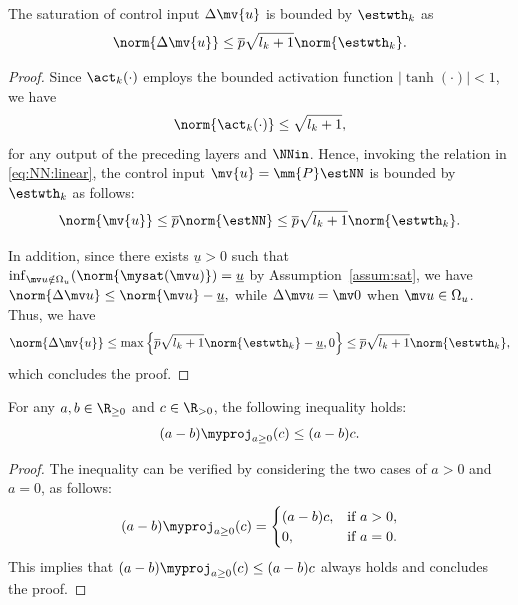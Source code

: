 \documentclass[letterpaper, journal]{IEEEtran}
\begin{document}
\begin{lem} \label{lem:delta:u:bound}
  The saturation of control input $\Delta\mv{u}$ is bounded by $\estwth_k$ as 
  \begin{equation*}
    \norm{\Delta\mv{u}}
    \le 
    \overline{p}
    \sqrt{l_k+1}
    \norm{\estwth_k}
    .
  \end{equation*}
\end{lem}

\begin{proof}
  Since $\act_k(\cdot)$ employs the bounded activation function $\vert\tanh(\cdot)\vert < 1$, we have 
  \begin{equation}
    \norm{\act_k(\cdot)} \le \sqrt{l_k+1}
    ,
  \end{equation}
  for any output of the preceding layers and $\NNin$.
  Hence, invoking the relation in \eqref{eq:NN:linear}, the control input $\mv{u}=\mm{P}\estNN$ is bounded by $\estwth_k$ as follows:
  \begin{equation} \label{eq:NN:bound}
    \norm{\mv{u}} 
    \le
    \overline{p}
    \norm{\estNN}
    \le
    \overline{p}
    \sqrt{l_k+1}\norm{\estwth_k}
    .   
  \end{equation}

  In addition, since there exists $\underline{u}>0$ such that $\inf_{\mv u\notin\Omega_u}\allowbreak(\norm{\mysat(\mv u)})=\underline{u}$ by Assumption~\ref{assum:sat}, we have
  $
    \norm{\Delta\mv u}
    \le
    \norm{\mv u}-\underline{u}
    ,
  $ 
  while $\Delta\mv u=\mv 0$ when $\mv u\in\Omega_u$.
  Thus, we have
  \begin{equation}
    \norm{\Delta\mv{u}}
    \le
    \max
    \left\{
      \overline{p}\sqrt{l_k+1}\norm{\estwth_k}
      -
      \underline{u}
      ,
      0
    \right\}
    \le
    \overline{p}\sqrt{l_k+1}\norm{\estwth_k}
    ,  
  \end{equation}
  which concludes the proof.    
\end{proof}

\begin{lem} \label{lem:proj:ineq}
  For any $a,b\in\R_{\ge0}$ and $c\in\R_{>0}$, the following inequality holds:
  \begin{equation}
    (a-b)\myproj_{a\ge0}(c) \le (a-b) c.
  \end{equation}
\end{lem}

\begin{proof}
  The inequality can be verified by considering the two cases of $a>0$ and $a=0$, as follows:
  \begin{equation*}
    (a-b)\myproj_{a\ge0}(c) 
    =
    \begin{cases}
      (a-b) c, & \text{if } a>0,
      \\
      0, & \text{if } a=0.
    \end{cases}
  \end{equation*}
  This implies that $(a-b)\myproj_{a\ge0}(c) \le (a-b) c$ always holds and concludes the proof.
\end{proof}
\end{document}
